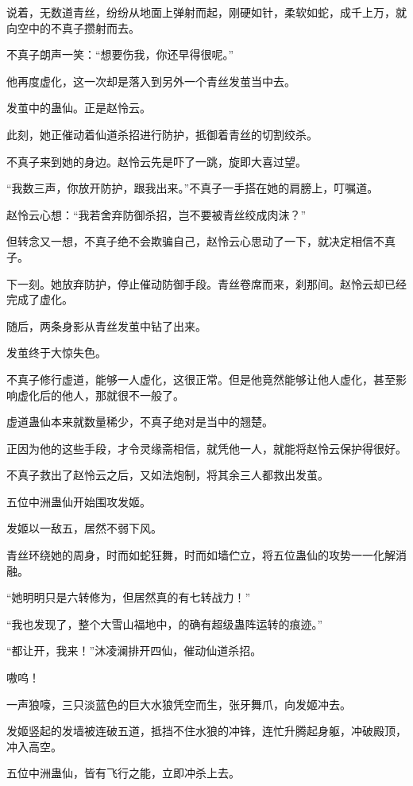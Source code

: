 \begin{this_body}
说着，无数道青丝，纷纷从地面上弹射而起，刚硬如针，柔软如蛇，成千上万，就向空中的不真子攒射而去。

不真子朗声一笑：“想要伤我，你还早得很呢。”

他再度虚化，这一次却是落入到另外一个青丝发茧当中去。

发茧中的蛊仙。正是赵怜云。

此刻，她正催动着仙道杀招进行防护，抵御着青丝的切割绞杀。

不真子来到她的身边。赵怜云先是吓了一跳，旋即大喜过望。

“我数三声，你放开防护，跟我出来。”不真子一手搭在她的肩膀上，叮嘱道。

赵怜云心想：“我若舍弃防御杀招，岂不要被青丝绞成肉沫？”

但转念又一想，不真子绝不会欺骗自己，赵怜云心思动了一下，就决定相信不真子。

下一刻。她放弃防护，停止催动防御手段。青丝卷席而来，刹那间。赵怜云却已经完成了虚化。

随后，两条身影从青丝发茧中钻了出来。

发茧终于大惊失色。

不真子修行虚道，能够一人虚化，这很正常。但是他竟然能够让他人虚化，甚至影响虚化后的他人，那就很不一般了。

虚道蛊仙本来就数量稀少，不真子绝对是当中的翘楚。

正因为他的这些手段，才令灵缘斋相信，就凭他一人，就能将赵怜云保护得很好。

不真子救出了赵怜云之后，又如法炮制，将其余三人都救出发茧。

五位中洲蛊仙开始围攻发姬。

发姬以一敌五，居然不弱下风。

青丝环绕她的周身，时而如蛇狂舞，时而如墙伫立，将五位蛊仙的攻势一一化解消融。

“她明明只是六转修为，但居然真的有七转战力！”

“我也发现了，整个大雪山福地中，的确有超级蛊阵运转的痕迹。”

“都让开，我来！”沐凌澜排开四仙，催动仙道杀招。

嗷呜！

一声狼嚎，三只淡蓝色的巨大水狼凭空而生，张牙舞爪，向发姬冲去。

发姬竖起的发墙被连破五道，抵挡不住水狼的冲锋，连忙升腾起身躯，冲破殿顶，冲入高空。

五位中洲蛊仙，皆有飞行之能，立即冲杀上去。


\end{this_body}
